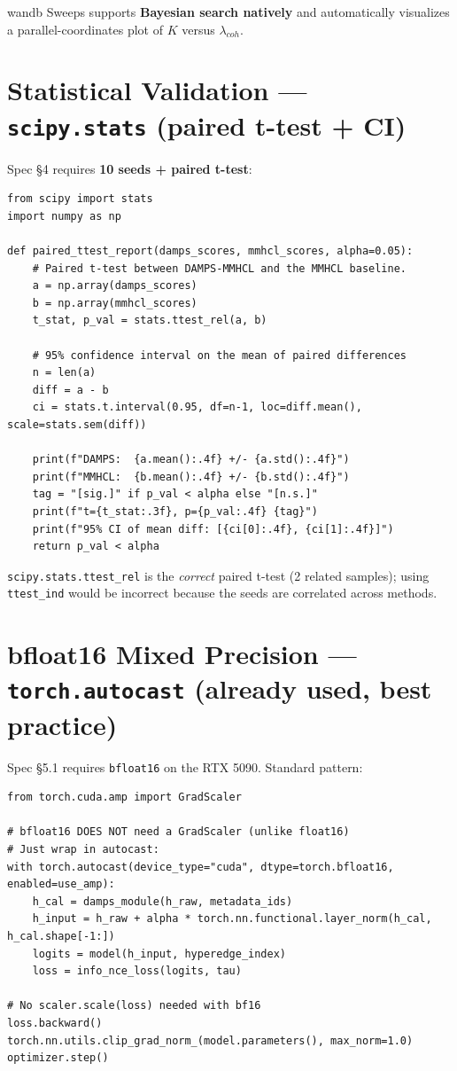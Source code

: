 \documentclass[11pt, a4paper]{article}
\begin{document}
wandb Sweeps supports \textbf{Bayesian search natively} and automatically visualizes a parallel-coordinates plot of $K$ versus $\lambda_{coh}$.

\section{Statistical Validation --- \texttt{scipy.stats} (paired t-test + CI)}

Spec \S4 requires \textbf{10 seeds + paired t-test}:

\begin{lstlisting}
from scipy import stats
import numpy as np

def paired_ttest_report(damps_scores, mmhcl_scores, alpha=0.05):
    # Paired t-test between DAMPS-MMHCL and the MMHCL baseline.
    a = np.array(damps_scores)
    b = np.array(mmhcl_scores)
    t_stat, p_val = stats.ttest_rel(a, b)

    # 95% confidence interval on the mean of paired differences
    n = len(a)
    diff = a - b
    ci = stats.t.interval(0.95, df=n-1, loc=diff.mean(), scale=stats.sem(diff))

    print(f"DAMPS:  {a.mean():.4f} +/- {a.std():.4f}")
    print(f"MMHCL:  {b.mean():.4f} +/- {b.std():.4f}")
    tag = "[sig.]" if p_val < alpha else "[n.s.]"
    print(f"t={t_stat:.3f}, p={p_val:.4f} {tag}")
    print(f"95% CI of mean diff: [{ci[0]:.4f}, {ci[1]:.4f}]")
    return p_val < alpha
\end{lstlisting}

\texttt{scipy.stats.ttest\_rel} is the \emph{correct} paired t-test (2 related samples); using \texttt{ttest\_ind} would be incorrect because the seeds are correlated across methods.

\section{bfloat16 Mixed Precision --- \texttt{torch.autocast} (already used, best practice)}

Spec \S5.1 requires \texttt{bfloat16} on the RTX 5090. Standard pattern:

\begin{lstlisting}
from torch.cuda.amp import GradScaler

# bfloat16 DOES NOT need a GradScaler (unlike float16)
# Just wrap in autocast:
with torch.autocast(device_type="cuda", dtype=torch.bfloat16, enabled=use_amp):
    h_cal = damps_module(h_raw, metadata_ids)
    h_input = h_raw + alpha * torch.nn.functional.layer_norm(h_cal, h_cal.shape[-1:])
    logits = model(h_input, hyperedge_index)
    loss = info_nce_loss(logits, tau)

# No scaler.scale(loss) needed with bf16
loss.backward()
torch.nn.utils.clip_grad_norm_(model.parameters(), max_norm=1.0)
optimizer.step()
\end{lstlisting}
\end{document}
